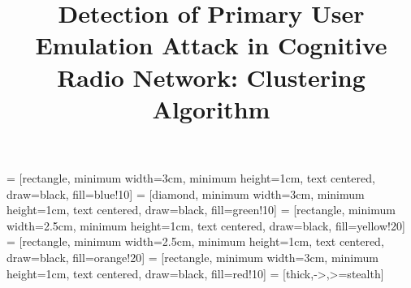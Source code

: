 \documentclass[10pt, oneside, article]{Thesis} %
\title{Detection of Primary User Emulation
Attack in Cognitive Radio Network:
Clustering Algorithm} %
\begin{document}
\usetikzlibrary{shapes.geometric, arrows, positioning, fit}

 = [rectangle, minimum width=3cm, minimum height=1cm, text centered, draw=black, fill=blue!10]
 = [diamond, minimum width=3cm, minimum height=1cm, text centered, draw=black, fill=green!10]
 = [rectangle, minimum width=2.5cm, minimum height=1cm, text centered, draw=black, fill=yellow!20]
 = [rectangle, minimum width=2.5cm, minimum height=1cm, text centered, draw=black, fill=orange!20]
 = [rectangle, minimum width=3cm, minimum height=1cm, text centered, draw=black, fill=red!10]
 = [thick,->,>=stealth]

\frontmatter %


\fancyhf{} %

\fancyhead[RO,LE]{\thepage}

\fancyhead[LO,RE]{\nouppercase{\leftmark}}


\pagestyle{fancy} %

\newcommand{\HRule}{\rule{\linewidth}{0.5mm}} %

\hypersetup{pdfsubject=\subjectname}
\hypersetup{pdfauthor=\authornames}
\hypersetup{pdfkeywords=\keywordnames}

\end{document}
